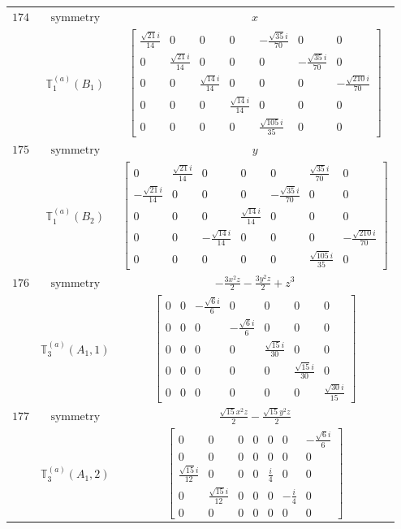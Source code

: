 \documentclass[fleqn,8pt,landscape]{jsarticle}
\begin{document}
\begin{longtable}{ccc}
$ 174 $ & $ \text{symmetry} $ & $ x $ \\
$  $ & $ \mathbb{T}_{1}^{(a)}(B_{1}) $ & $ \begin{bmatrix} \frac{\sqrt{21} i}{14} & 0 & 0 & 0 & - \frac{\sqrt{35} i}{70} & 0 & 0 \\ 0 & \frac{\sqrt{21} i}{14} & 0 & 0 & 0 & - \frac{\sqrt{35} i}{70} & 0 \\ 0 & 0 & \frac{\sqrt{14} i}{14} & 0 & 0 & 0 & - \frac{\sqrt{210} i}{70} \\ 0 & 0 & 0 & \frac{\sqrt{14} i}{14} & 0 & 0 & 0 \\ 0 & 0 & 0 & 0 & \frac{\sqrt{105} i}{35} & 0 & 0 \end{bmatrix} $ \\ \hline
$ 175 $ & $ \text{symmetry} $ & $ y $ \\
$  $ & $ \mathbb{T}_{1}^{(a)}(B_{2}) $ & $ \begin{bmatrix} 0 & \frac{\sqrt{21} i}{14} & 0 & 0 & 0 & \frac{\sqrt{35} i}{70} & 0 \\ - \frac{\sqrt{21} i}{14} & 0 & 0 & 0 & - \frac{\sqrt{35} i}{70} & 0 & 0 \\ 0 & 0 & 0 & \frac{\sqrt{14} i}{14} & 0 & 0 & 0 \\ 0 & 0 & - \frac{\sqrt{14} i}{14} & 0 & 0 & 0 & - \frac{\sqrt{210} i}{70} \\ 0 & 0 & 0 & 0 & 0 & \frac{\sqrt{105} i}{35} & 0 \end{bmatrix} $ \\ \hline
$ 176 $ & $ \text{symmetry} $ & $ - \frac{3 x^{2} z}{2} - \frac{3 y^{2} z}{2} + z^{3} $ \\
$  $ & $ \mathbb{T}_{3}^{(a)}(A_{1},1) $ & $ \begin{bmatrix} 0 & 0 & - \frac{\sqrt{6} i}{6} & 0 & 0 & 0 & 0 \\ 0 & 0 & 0 & - \frac{\sqrt{6} i}{6} & 0 & 0 & 0 \\ 0 & 0 & 0 & 0 & \frac{\sqrt{15} i}{30} & 0 & 0 \\ 0 & 0 & 0 & 0 & 0 & \frac{\sqrt{15} i}{30} & 0 \\ 0 & 0 & 0 & 0 & 0 & 0 & \frac{\sqrt{30} i}{15} \end{bmatrix} $ \\ \hline
$ 177 $ & $ \text{symmetry} $ & $ \frac{\sqrt{15} x^{2} z}{2} - \frac{\sqrt{15} y^{2} z}{2} $ \\
$  $ & $ \mathbb{T}_{3}^{(a)}(A_{1},2) $ & $ \begin{bmatrix} 0 & 0 & 0 & 0 & 0 & 0 & - \frac{\sqrt{6} i}{6} \\ 0 & 0 & 0 & 0 & 0 & 0 & 0 \\ \frac{\sqrt{15} i}{12} & 0 & 0 & 0 & \frac{i}{4} & 0 & 0 \\ 0 & \frac{\sqrt{15} i}{12} & 0 & 0 & 0 & - \frac{i}{4} & 0 \\ 0 & 0 & 0 & 0 & 0 & 0 & 0 \end{bmatrix} $ \\ \hline

\end{longtable}
\end{document}
